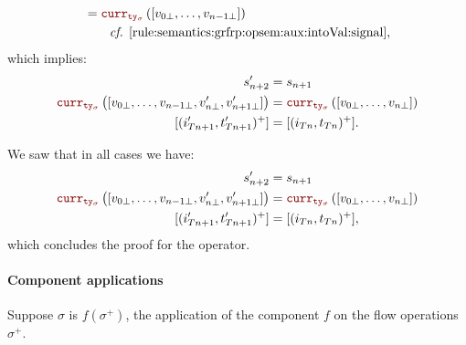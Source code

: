 \begin{skippableproof}
\begin{itemize}
\begin{align*}
                                                                                                 & = \CurrVal{ty_\sigma}{[v_{0\bot}, \dots, v_{n-1\bot}]}                  \\
                                                                                                 & \qquad \text{\cf \Cref{rule:semantics:grfrp:opsem:aux:intoVal:signal}},
              \end{align*}
              which implies:
              \begin{align*}
                  s'_{n+2}                                                                       & = s_{n+1}                                            \\
                  \CurrVal{ty_\sigma}{[v_{0\bot}, \dots, v_{n-1\bot}, v'_{n\bot}, v'_{n+1\bot}]} & = \CurrVal{ty_\sigma}{[v_{0\bot}, \dots, v_{n\bot}]} \\
                  [(i'_{Tn+1}, t'_{Tn+1})^+]                                                     & = [(i_{Tn}, t_{Tn})^+].
              \end{align*}
    \end{itemize}
    We saw that in all cases we have:
    \begin{align*}
        s'_{n+2}                                                                       & = s_{n+1}                                            \\
        \CurrVal{ty_\sigma}{[v_{0\bot}, \dots, v_{n-1\bot}, v'_{n\bot}, v'_{n+1\bot}]} & = \CurrVal{ty_\sigma}{[v_{0\bot}, \dots, v_{n\bot}]} \\
        [(i'_{Tn+1}, t'_{Tn+1})^+]                                                     & = [(i_{Tn}, t_{Tn})^+],
    \end{align*}
    which concludes the proof for the  operator.

    \paragraph{Component applications}
    Suppose $\sigma$ is $f(\sigma^+)$, the application of the component $f$ on the flow operations
    $\sigma^+$.


\end{skippableproof}
